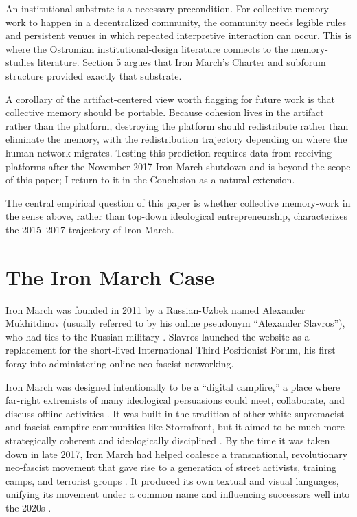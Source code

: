 \documentclass[bibtex,autowc,nonblind]{apsr_submission}
\begin{document}
An institutional substrate is a necessary precondition. For collective memory-work to happen in a decentralized community, the community needs legible rules and persistent venues in which repeated interpretive interaction can occur. This is where the Ostromian institutional-design literature connects to the memory-studies literature. Section 5 argues that Iron March's Charter and subforum structure provided exactly that substrate.

A corollary of the artifact-centered view worth flagging for future work is that collective memory should be portable. Because cohesion lives in the artifact rather than the platform, destroying the platform should redistribute rather than eliminate the memory, with the redistribution trajectory depending on where the human network migrates. Testing this prediction requires data from receiving platforms after the November 2017 Iron March shutdown and is beyond the scope of this paper; I return to it in the Conclusion as a natural extension.

The central empirical question of this paper is whether collective memory-work in the sense above, rather than top-down ideological entrepreneurship, characterizes the 2015--2017 trajectory of Iron March.

\section{The Iron March Case}

Iron March was founded in 2011 by a Russian-Uzbek named Alexander Mukhitdinov (usually referred to by his online pseudonym ``Alexander Slavros''), who had ties to the Russian military \citep{upchurch, newhouse2021threat}. Slavros launched the website as a replacement for the short-lived International Third Positionist Forum, his first foray into administering online neo-fascist networking.

Iron March was designed intentionally to be a ``digital campfire,'' a place where far-right extremists of many ideological persuasions could meet, collaborate, and discuss offline activities \citep{tornberg2024echo}. It was built in the tradition of other white supremacist and fascist campfire communities like Stormfront, but it aimed to be much more strategically coherent and ideologically disciplined \citep{caren2012social, de2008stormfront}. By the time it was taken down in late 2017, Iron March had helped coalesce a transnational, revolutionary neo-fascist movement that gave rise to a generation of street activists, training camps, and terrorist groups \citep{upchurch}. It produced its own textual and visual languages, unifying its movement under a common name and influencing successors well into the 2020s \citep{colin2024and, argentino2022one}.
\end{document}
